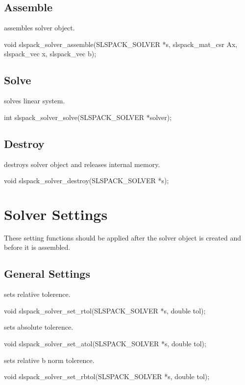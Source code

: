 \subsection{Assemble}
 assembles solver object.
\begin{evb}
void slspack_solver_assemble(SLSPACK_SOLVER *s, slspack_mat_csr Ax, slspack_vec x,
    slspack_vec b);
\end{evb}

\subsection{Solve}
 solves linear system.
\begin{evb}
int slspack_solver_solve(SLSPACK_SOLVER *solver);
\end{evb}

\subsection{Destroy}
 destroys solver object and releases internal
memory.
\begin{evb}
void slspack_solver_destroy(SLSPACK_SOLVER *s);
\end{evb}

\section{Solver Settings}

These setting functions should be applied after the solver object is created and before
it is assembled.

\subsection{General Settings}

 sets relative tolerence.
\begin{evb}
void slspack_solver_set_rtol(SLSPACK_SOLVER *s, double tol);
\end{evb}

 sets absolute tolerence.
\begin{evb}
void slspack_solver_set_atol(SLSPACK_SOLVER *s, double tol);
\end{evb}

 sets relative b norm tolerence.
\begin{evb}
void slspack_solver_set_rbtol(SLSPACK_SOLVER *s, double tol);
\end{evb}

